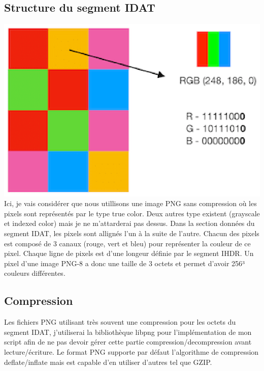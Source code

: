\subsection{Structure du segment IDAT}
\includegraphics[width=1\textwidth]{img/RGB-png-bit-pixel-mode.eps}
Ici, je vais considérer que nous utillisons une image PNG sans compression où les pixels sont représentés par le type true color. Deux autres type existent (grayscale et indexed color) mais je ne m'attarderai pas dessus.
\newline
Dans la section données du segment IDAT, les pixels sont allignés l'un à la suite de l'autre. Chacun des pixels est composé de 3 canaux (rouge, vert et bleu) pour représenter la couleur de ce pixel. Chaque ligne de pixels est d'une longeur définie par le segment IHDR.
\newline
Un pixel d'une image PNG-8 a donc une taille de 3 octets et permet d'avoir 256³ couleurs différentes.
\subsection{Compression}
Les fichiers PNG utilisant très souvent une compression pour les octets du segment IDAT, j'utiliserai la bibliothèque libpng pour l'implémentation de mon script afin de ne pas devoir gérer cette partie compression/decompression avant lecture/écriture.
\newline
Le format PNG supporte par défaut l'algorithme de compression deflate/inflate mais est capable d'en utiliser d'autres tel que GZIP.
